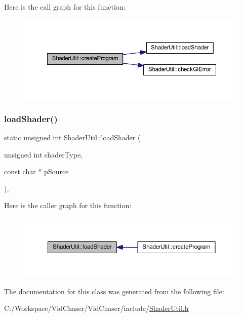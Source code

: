 Here is the call graph for this function\+:\nopagebreak
\begin{figure}[H]
\begin{center}
\leavevmode
\includegraphics[width=350pt]{class_shader_util_a1bcf8dcf6d12750db82a13321257a33e_cgraph}
\end{center}
\end{figure}
\mbox{\label{class_shader_util_a5553f8c24c0182433c9bb3054035a376}} 
\subsubsection{\texorpdfstring{load\+Shader()}{loadShader()}}
{\footnotesize\ttfamily static unsigned int Shader\+Util\+::load\+Shader (\begin{DoxyParamCaption}\item[{unsigned int}]{shader\+Type,  }\item[{const char $\ast$}]{p\+Source }\end{DoxyParamCaption})\hspace{0.3cm}{\ttfamily [inline]}, {\ttfamily [static]}}

Here is the caller graph for this function\+:\nopagebreak
\begin{figure}[H]
\begin{center}
\leavevmode
\includegraphics[width=350pt]{class_shader_util_a5553f8c24c0182433c9bb3054035a376_icgraph}
\end{center}
\end{figure}


The documentation for this class was generated from the following file\+:\begin{DoxyCompactItemize}
\item 
C\+:/\+Workspace/\+Vid\+Chaser/\+Vid\+Chaser/include/\hyperlink{_shader_util_8h}{Shader\+Util.\+h}\end{DoxyCompactItemize}

